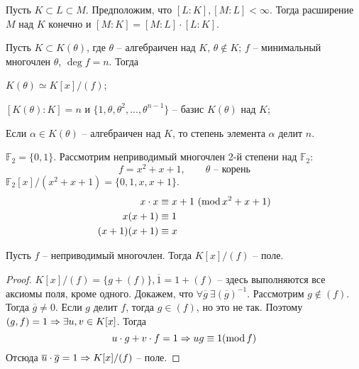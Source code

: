\begin{Thm}
	Пусть $K \subset L \subset M$. Предположим, что $[L : K], [M : L] < \infty$.
	Тогда расширение $M$ над $K$ конечно и $[M : K] = [M : L] \cdot [L : K]$.   
\end{Thm}

\begin{Thm}
	Пусть $K \subset K(\theta)$, где $\theta$ -- алгебраичен над $K$, $\theta \notin K$; $f$ -- минимальный многочлен $\theta$, $\deg f = n$.
	Тогда 
	\begin{MyList}
		\item $K(\theta) \simeq K[x] / (f)$;
		\item $[K(\theta) : K] = n$ и $\{1, \theta, \theta^2, ..., \theta^{n - 1}\}$ -- базис $K(\theta)$ над $K$;
		\item Если $\alpha \in K(\theta)$ -- алгебраичен над $K$, то степень элемента $\alpha$ делит $n$.  
	\end{MyList} 
\end{Thm}

\begin{Example}
	$\mathbb{F}_2 = \{0, 1\}$. Рассмотрим неприводимый многочлен 2-й степени над $\mathbb{F}_2$:
	\[f = x^2 + x + 1, \qquad \theta \text{ -- корень}\]
	$\mathbb{F}_2[x] / (x^2 + x + 1) = \{0, 1, x, x + 1\}$.
	\begin{align*}
		x \cdot x &\equiv x + 1 \ (\mathrm{mod}\, x^2 + x + 1) \\
		x (x + 1) &\equiv 1 \\
		(x + 1)(x + 1) &\equiv x
	\end{align*}

\end{Example}

\begin{Lm}
	Пусть $f$ -- неприводимый многочлен. Тогда $K[x]/(f)$ -- поле.
\end{Lm}

\begin{proof}
	$K[x]/(f) = \{g + (f)\}, \overline{1} = 1 + (f)$ -- здесь выполняются все аксиомы поля, кроме одного.
	Докажем, что $\forall \overline{g} \ \exists (\overline{g})^{-1}$. Рассмотрим $g \notin (f)$. Тогда $\overline{g} \neq 0$. Если $g$ делит $f$, тогда $g \in (f)$, но это не так.
	Поэтому $(g, f) = 1 \Rightarrow \exists u, v \in K[x]$. Тогда
	\[u \cdot g + v \cdot f = 1 \Rightarrow ug \equiv 1 (\mathrm{mod}\, f)\]
	Отсюда $\overline{u} \cdot \overline{g} = 1 \Rightarrow K[x] / (f)$ -- поле.
\end{proof}

